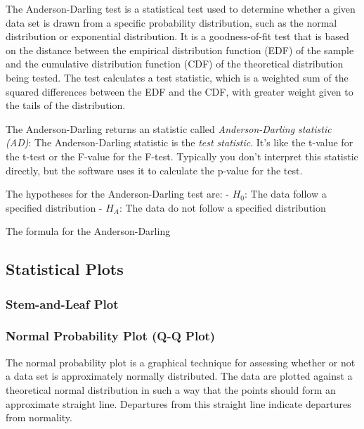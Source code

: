 \documentclass[11pt]{article}
\begin{document}
The Anderson-Darling test is a statistical test used to determine
whether a given data set is drawn from a specific probability
distribution, such as the normal distribution or exponential
distribution. It is a goodness-of-fit test that is based on the distance
between the empirical distribution function (EDF) of the sample and the
cumulative distribution function (CDF) of the theoretical distribution
being tested. The test calculates a test statistic, which is a weighted
sum of the squared differences between the EDF and the CDF, with greater
weight given to the tails of the distribution.

The Anderson-Darling returns an statistic called \emph{Anderson-Darling
statistic (AD)}: The Anderson-Darling statistic is the \emph{test
statistic}. It's like the t-value for the t-test or the F-value for the
F-test. Typically you don't interpret this statistic directly, but the
software uses it to calculate the p-value for the test.

The hypotheses for the Anderson-Darling test are: - \(H_0\): The data
follow a specified distribution - \(H_A\): The data do not follow a
specified distribution

The formula for the Anderson-Darling

    \hypertarget{statistical-plots}{%
\subsection{Statistical Plots}\label{statistical-plots}}

\hypertarget{stem-and-leaf-plot}{%
\subsubsection{Stem-and-Leaf Plot}\label{stem-and-leaf-plot}}

\hypertarget{normal-probability-plot-q-q-plot}{%
\subsubsection{Normal Probability Plot (Q-Q
Plot)}\label{normal-probability-plot-q-q-plot}}

The normal probability plot is a graphical technique for assessing
whether or not a data set is approximately normally distributed. The
data are plotted against a theoretical normal distribution in such a way
that the points should form an approximate straight line. Departures
from this straight line indicate departures from normality.
\end{document}
